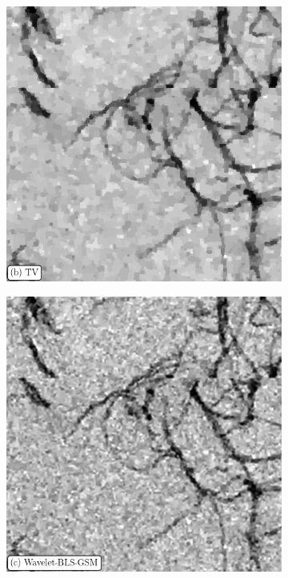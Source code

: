 \begin{figure}[!h]
\begin{subfigure}{0.32\textwidth}
    \includegraphics[width=\textwidth]{Figures/chapter-temsaxs/pectin_TV_lam015_crop_tile01_500x500_900_1900_label.png}\label{fig:denoise_comparison_pectin_TV}
  \end{subfigure}
  \begin{subfigure}{0.32\textwidth}
    \includegraphics[width=\textwidth]{Figures/chapter-temsaxs/pectinPortillaSigma28_crop_tile01_500x500_900_1900_label.png}\label{fig:denoise_comparison_pectin_wavelet}

\end{subfigure}
\end{figure}
